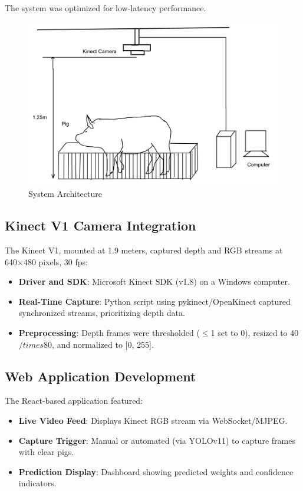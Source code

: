 {The system was optimized for low-latency performance.

\begin{figure}[h]
	\centering
	\includegraphics[height=0.4\textheight]{figures/Untitled-1wqw}
	\caption{System Architecture}
	\label{fig:System Architecture2}
\end{figure}

\newpage

\subsection{Kinect V1 Camera Integration}

The Kinect V1, mounted at 1.9 meters, captured depth and RGB streams at 640×480 pixels, 30 fps:

\begin{itemize}
	\item \textbf{Driver and SDK}: Microsoft Kinect SDK (v1.8) on a Windows computer.
	\item \textbf{Real-Time Capture}: Python script using pykinect/OpenKinect captured synchronized streams, prioritizing depth data.
	\item \textbf{Preprocessing}: Depth frames were thresholded ($\leq$1 set to 0), resized to 40$/times$80, and normalized to [0, 255].
\end{itemize}

\subsection{Web Application Development}

The React-based application featured:

\begin{itemize}
	\item \textbf{Live Video Feed}: Displays Kinect RGB stream via WebSocket/MJPEG.
	\item \textbf{Capture Trigger}: Manual or automated (via YOLOv11) to capture frames with clear pigs.
	\item \textbf{Prediction Display}: Dashboard showing predicted weights and confidence indicators.
\end{itemize}

}
